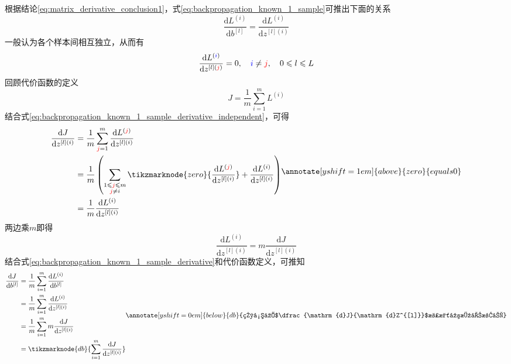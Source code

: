 根据结论\eqref{eq:matrix_derivative_conclusion1}，式\eqref{eq:backpropagation_known_1_sample}可推出下面的关系
\begin{equation}
    \frac{\mathrm{d}L^{(i)}}{\mathrm{d}b^{[l]}} = \frac{\mathrm{d}L^{(i)}}{\mathrm{d}z^{[l](i)}}
    \label{eq:backpropagation_known_1_sample_derivative}
\end{equation}
一般认为各个样本间相互独立，从而有
\begin{equation}
    \frac{\mathrm{d}L^{(\textcolor{blue}{i})}}{\mathrm{d}z^{[l](\textcolor{red}{j})}}=0
    , \quad \textcolor{blue}{i} \neq \textcolor{red}{j}, \quad 0 \leqslant l \leqslant L
    \label{eq:backpropagation_known_1_sample_derivative_independent}
\end{equation}
回顾代价函数的定义
\begin{equation}
    J = \frac{1}{m} \sum_{i=1}^{m} L^{(i)}
\end{equation}
结合式\eqref{eq:backpropagation_known_1_sample_derivative_independent}，可得
\begin{equation}
    \begin{aligned}
        \frac{\mathrm{d}J}{\mathrm{d}z^{[l](i)}} 
        &= \frac{1}{m}  \sum_{\textcolor{red}{j}=1}^{m} \frac{\mathrm{d}L^{(\textcolor{red}{j})}}{\mathrm{d}z^{[l](i)}} \\
        &= \frac{1}{m}  \left( \sum_{\substack{1 \leqslant \textcolor{red}{j} \leqslant m \\ \textcolor{red}{j} \neq i}} \tikzmarknode{zero}{\frac{\mathrm{d}L^{(\textcolor{red}{j})}}{\mathrm{d}z^{[l](i)}}} + \frac{\mathrm{d}L^{(i)}}{\mathrm{d}z^{[l](i)}} \right) \\
        &= \frac{1}{m} \frac{\mathrm{d}L^{(i)}}{\mathrm{d}z^{[l](i)}} \\
    \end{aligned}
    \annotate[yshift=1em]{above}{zero}{equals 0}
\end{equation}
两边乘$m$即得
\begin{equation}
    \frac{\mathrm{d}L^{(i)}}{\mathrm{d}z^{[l](i)}} = m \frac{\mathrm{d}J}{\mathrm{d}z^{[l](i)}}
\end{equation}
结合式\eqref{eq:backpropagation_known_1_sample_derivative}和代价函数定义，可推知
\begin{equation}
    \begin{aligned}
        \frac{\mathrm{d}J}{\mathrm{d}b^{[l]}} 
        &= \frac{1}{m} \sum_{i=1}^{m} \frac{\mathrm{d}L^{(i)}}{\mathrm{d}b^{[l]}} \\
        &= \frac{1}{m} \sum_{i=1}^{m} \frac{\mathrm{d}L^{(i)}}{\mathrm{d}z^{[l](i)}} \\
        &= \frac{1}{m} \sum_{i=1}^{m} m \frac{\mathrm{d}J}{\mathrm{d}z^{[l](i)}} \\
        &= \tikzmarknode{db}{\sum_{i=1}^{m} \frac{\mathrm{d}J}{\mathrm{d}z^{[l](i)}}}
    \label{eq:backpropagation_conc_4}
    \end{aligned}
    \vspace{2em}
    \renewcommand{\eqnannotationstrut}{\rule[-0.7\baselineskip]{0pt}{1.5\baselineskip}}
    \annotate[yshift=0em]{below}{db}{相当于$\dfrac{\mathrm{d}J}{\mathrm{d}Z^{[l]}}$沿水平方向求和}
    \renewcommand{\eqnannotationstrut}{\strut} %
\end{equation}
